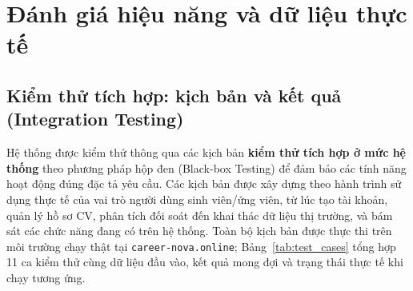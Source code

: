 \section{Đánh giá hiệu năng và dữ liệu thực tế}
\subsection{Kiểm thử tích hợp: kịch bản và kết quả (Integration Testing)}
\label{subsec:integration_test}

Hệ thống được kiểm thử thông qua các kịch bản \textbf{kiểm thử tích hợp ở mức hệ thống} theo phương pháp hộp đen (Black-box Testing) để đảm bảo các tính năng hoạt động đúng đặc tả yêu cầu. Các kịch bản được xây dựng theo hành trình sử dụng thực tế của vai trò người dùng sinh viên/ứng viên, từ lúc tạo tài khoản, quản lý hồ sơ CV, phân tích đối soát đến khai thác dữ liệu thị trường, và bám sát các chức năng đang có trên hệ thống. Toàn bộ kịch bản được thực thi trên môi trường chạy thật tại \texttt{career-nova.online}; Bảng~\ref{tab:test_cases} tổng hợp 11 ca kiểm thử cùng dữ liệu đầu vào, kết quả mong đợi và trạng thái thực tế khi chạy tương ứng.

